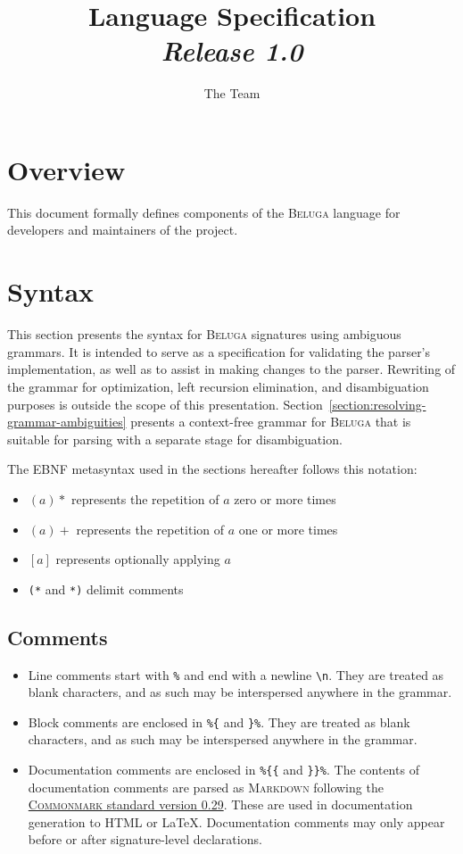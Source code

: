 \documentclass[11pt]{article}
\title{%
\Beluga Language Specification%
\\\Large\textit{Release 1.0}
}
\author{The \Beluga Team}
\newcommand{\Beluga}{\textsc{Beluga}\xspace}
\begin{document}
\maketitle

\tableofcontents

\section*{Overview}

This document formally defines components of the \Beluga language for developers and maintainers of the project.

\section{Syntax}\label{section:syntax}

This section presents the syntax for \Beluga signatures using ambiguous grammars.
It is intended to serve as a specification for validating the parser's implementation, as well as to assist in making changes to the parser.
Rewriting of the grammar for optimization, left recursion elimination, and disambiguation purposes is outside the scope of this presentation.
Section~\ref{section:resolving-grammar-ambiguities} presents a context-free grammar for \Beluga that is suitable for parsing with a separate stage for disambiguation.

The EBNF metasyntax used in the sections hereafter follows this notation:

\begin{itemize}
\item $ (a)* $ represents the repetition of $ a $ zero or more times
\item $ (a)+ $ represents the repetition of $ a $ one or more times
\item $ [a] $ represents optionally applying $ a $
\item \texttt{(*} and \texttt{*)} delimit comments
\end{itemize}

\subsection{Comments}

\begin{itemize}
\item
Line comments start with \texttt{\%} and end with a newline \texttt{\textbackslash n}.
They are treated as blank characters, and as such may be interspersed anywhere in the grammar.
\item
Block comments are enclosed in \texttt{\%\{} and \texttt{\}\%}.
They are treated as blank characters, and as such may be interspersed anywhere in the grammar.
\item
Documentation comments are enclosed in \texttt{\%\{\{} and \texttt{\}\}\%}.
The contents of documentation comments are parsed as \textsc{Markdown} following the \href{https://spec.commonmark.org/0.29}{\textsc{Commonmark} standard version 0.29}.
These are used in documentation generation to \textsc{HTML} or \LaTeX.
Documentation comments may only appear before or after signature-level declarations.
\end{itemize}
\end{document}
